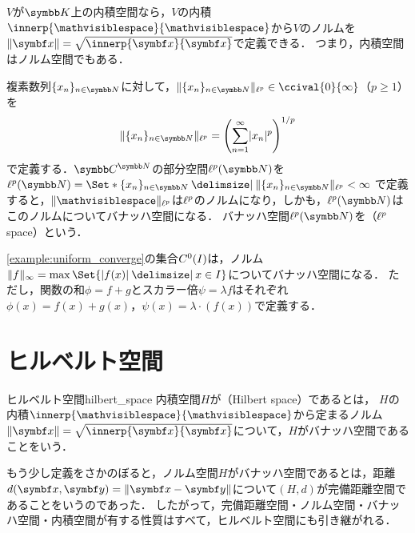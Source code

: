 \documentclass[../../main]{subfiles}
\begin{document}
\begin{example}
  \(V\)が\(\numset{K}\)上の内積空間なら，\(V\)の内積\(\innerp{\holder}{\holder}\)から\(V\)のノルムを\(\vnorm{\vect{x}}=\sqrt{\innerp{\vect{x}}{\vect{x}}}\)で定義できる．
  つまり，内積空間はノルム空間でもある．
\end{example}

\begin{example}[\(\lebesgue{p}\)空間]
  複素数列\(\seq{x_n}_{n\in\numset{N}}\)に対して，\(\vnorm{\seq{x_n}_{n\in\numset{N}}}_{\lebesgue{p}}\in\ccival{0}{\infty}\)（\(p\geq 1\)）を
  \[
    \vnorm{\seq{x_n}_{n\in\numset{N}}}_{\lebesgue{p}} = \pqty*{\sum_{n=1}^\infty\abs{x_n}^p}^{1/p}
  \]
  で定義する．\(\numset{C}^{\numset{N}}\)の部分空間\(\lebesgue{p}(\numset{N})\)を\(\lebesgue{p}(\numset{N})=\Set*{\seq{x_n}_{n\in\numset{N}}\given\vnorm{\seq{x_n}_{n\in\numset{N}}}_{\lebesgue{p}}<\infty}\)
  で定義すると，\(\vnorm{\holder}_{\lebesgue{p}}\)は\(\lebesgue{p}\)のノルムになり，しかも，\(\lebesgue{p}(\numset{N})\)はこのノルムについてバナッハ空間になる．
  バナッハ空間\(\lebesgue{p}(\numset{N})\)を（\(\lebesgue{p}\) space）という．
\end{example}

\begin{example}
  \cref{example:uniform_converge}の集合\(C^0(I)\)は，ノルム\(\vnorm{f}_\infty=\max\Set{\abs{f(x)}\given x\in I}\)についてバナッハ空間になる．
  ただし，関数の和\(\phi=f+g\)とスカラー倍\(\psi=\lambda f\)はそれぞれ\(\phi(x)=f(x)+g(x)\)，\(\psi(x)=\lambda\cdot(f(x))\)で定義する．
\end{example}

\section{ヒルベルト空間}

\begin{definition}{ヒルベルト空間}{hilbert_space}
  内積空間\(H\)が（Hilbert space）であるとは，
  \(H\)の内積\(\innerp{\holder}{\holder}\)から定まるノルム\(\vnorm{\vect{x}}=\sqrt{\innerp{\vect{x}}{\vect{x}}}\)について，\(H\)がバナッハ空間であることをいう．
\end{definition}

もう少し定義をさかのぼると，ノルム空間\(H\)がバナッハ空間であるとは，距離\(d(\vect{x},\vect{y})=\vnorm{\vect{x}-\vect{y}}\)について\((H,d)\)が完備距離空間であることをいうのであった．
したがって，完備距離空間・ノルム空間・バナッハ空間・内積空間が有する性質はすべて，ヒルベルト空間にも引き継がれる．
\end{document}
